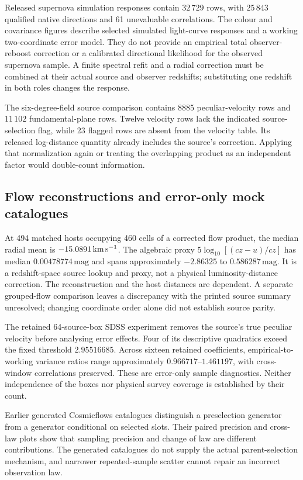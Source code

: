 Released supernova simulation responses contain $32\,729$ rows, with $25\,843$ qualified native directions and 61 unevaluable correlations. The colour and covariance figures describe selected simulated light-curve responses and a working two-coordinate error model. They do not provide an empirical total observer-reboost correction or a calibrated directional likelihood for the observed supernova sample. A finite spectral refit and a radial correction must be combined at their actual source and observer redshifts; substituting one redshift in both roles changes the response.

The six-degree-field source comparison contains 8885 peculiar-velocity rows and $11\,102$ fundamental-plane rows. Twelve velocity rows lack the indicated source-selection flag, while 23 flagged rows are absent from the velocity table. Its released log-distance quantity already includes the source's correction. Applying that normalization again or treating the overlapping product as an independent factor would double-count information.

\subsection{Flow reconstructions and error-only mock catalogues}

At 494 matched hosts occupying 460 cells of a corrected flow product, the median radial mean is $-15.0891\,\mathrm{km}\,\mathrm{s}^{-1}$. The algebraic proxy $5\log_{10}[(cz-u)/cz]$ has median $0.00478774\,\mathrm{mag}$ and spans approximately $-2.86325$ to $0.586287\,\mathrm{mag}$. It is a redshift-space source lookup and proxy, not a physical luminosity-distance correction. The reconstruction and the host distances are dependent. A separate grouped-flow comparison leaves a discrepancy with the printed source summary unresolved; changing coordinate order alone did not establish source parity.

The retained 64-source-box SDSS experiment removes the source's true peculiar velocity before analysing error effects. Four of its descriptive quadratics exceed the fixed threshold $2.95516685$. Across sixteen retained coefficients, empirical-to-working variance ratios range approximately $0.966717$--$1.461197$, with cross-window correlations preserved. These are error-only sample diagnostics. Neither independence of the boxes nor physical survey coverage is established by their count.

Earlier generated Cosmicflows catalogues distinguish a preselection generator from a generator conditional on selected slots. Their paired precision and cross-law plots show that sampling precision and change of law are different contributions. The generated catalogues do not supply the actual parent-selection mechanism, and narrower repeated-sample scatter cannot repair an incorrect observation law.

